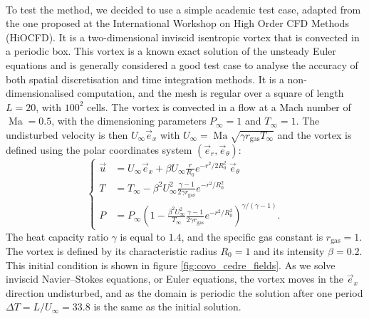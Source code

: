     \paragraph{}
    To test the method, we decided to use a simple academic test case, adapted from the one proposed at the International Workshop on High Order CFD Methods (HiOCFD).
    It is a two-dimensional inviscid isentropic vortex that is convected in a periodic box.
    This vortex is a known exact solution of the unsteady Euler equations and is generally considered a good test case to analyse the accuracy of both spatial discretisation and time integration methods.
    It is a non-dimensionalised computation, and the mesh is regular over a square of length $L = 20$, with $100^2$ cells.
    The vortex is convected in a flow at a Mach number of $\operatorname{Ma} = 0.5$, with the dimensioning parameters $P_\infty = 1$ and $T_\infty = 1$.
    The undisturbed velocity is then $U_\infty \vec{e}_x$ with $U_\infty = \operatorname{Ma} \sqrt{\gamma r_\textrm{gas} T_\infty}$ and the vortex is defined using the polar coordinates system $\left(\vec{e}_r, \vec{e}_\theta\right)$:
    \begin{equation}\label{eq:covo}
      \left\{\begin{aligned}
        \vec{u} &= U_\infty \vec{e}_x + \beta U_\infty \frac{r}{R_0} e^{-r^2 / 2 R_0^2} \ \vec{e}_\theta \\[10pt]
        T &= T_\infty - \beta^2 U_\infty^2 \frac{\gamma - 1}{2 \gamma r_\textrm{gas}} e^{-r^2 / R_0^2} \\[10pt]
        P &= P_\infty \left( 1 - \frac{\beta^2 U_\infty^2}{T_\infty} \frac{\gamma - 1}{2 \gamma r_\textrm{gas}} e^{-r^2 / R_0^2} \right)^{\gamma/\left(\gamma - 1\right)} .
      \end{aligned}\right.
    \end{equation}
    The heat capacity ratio $\gamma$ is equal to $1.4$, and the specific gas constant is $r_\textrm{gas} = 1$.
    The vortex is defined by its characteristic radius $R_0 = 1$ and its intensity $\beta = 0.2$.
    This initial condition is shown in figure \ref{fig:covo_cedre_fields}.
    As we solve inviscid Navier--Stokes equations, or Euler equations, the vortex moves in the $\vec{e}_x$ direction undisturbed, and as the domain is periodic the solution after one period $\Delta T = L/U_\infty = 33.8$ is the same as the initial solution.

